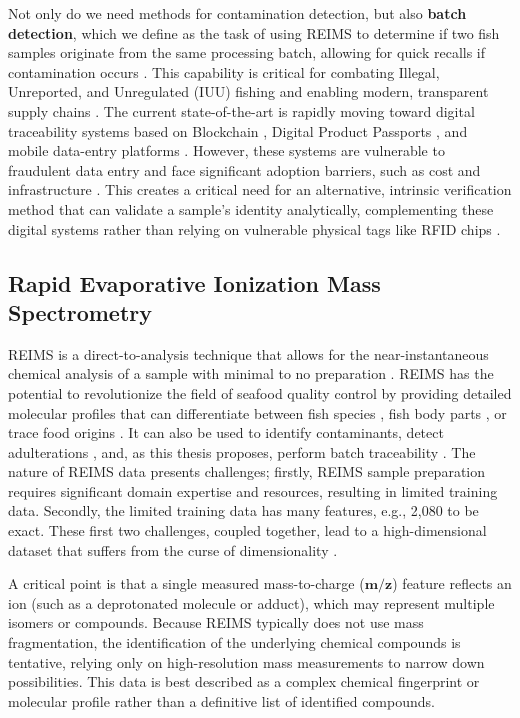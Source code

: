 Not only do we need methods for contamination detection, but also
\textbf{batch detection}, which we define as the task of using REIMS to determine if two fish samples originate from the same processing batch, allowing for quick recalls if contamination occurs \citep{Mai2010}. This capability is critical for combating Illegal, Unreported, and Unregulated (IUU) fishing \citep{Helyar2014} and enabling modern, transparent supply chains \citep{turkson2025digital}. The current state-of-the-art is rapidly moving toward digital traceability systems based on Blockchain \citep{dahariya2025enhancing}, Digital Product Passports \citep{jiang2025traceability}, and mobile data-entry platforms \citep{Untal2025, Gastaldi2025}. However, these systems are vulnerable to fraudulent data entry and face significant adoption barriers, such as cost and infrastructure \citep{Untal2025}. This creates a critical need for an alternative, intrinsic verification method that can validate a sample's identity analytically, complementing these digital systems rather than relying on vulnerable physical tags like RFID chips \citep{Mai2010}.

\subsection{Rapid Evaporative Ionization Mass Spectrometry}

REIMS \citep{Schaefer2009, Cafarella2024} is a direct-to-analysis technique that allows for the near-instantaneous chemical analysis of a sample with minimal to no preparation \citep{Henderson2025, Pruekprasert2025}. REIMS has the potential to revolutionize the field of seafood quality control \citep{Cafarella2024, Black2017} by providing detailed molecular profiles that can differentiate between fish species \citep{Black2017, Shen2020, Shen2022}, fish body parts \citep{Black2019}, or trace food origins \citep{Gao2025,Gkarane2025, Lu2024}. It can also be used to identify contaminants, detect adulterations \citep{Premanandh2013}, and, as this thesis proposes, perform batch traceability \citep{Mai2010}. The nature of REIMS data presents challenges; firstly, REIMS sample preparation requires significant domain expertise and resources, resulting in limited training data. Secondly, the limited training data has many features, e.g., 2,080 to be exact. These first two challenges, coupled together, lead to a high-dimensional dataset that suffers from the curse of dimensionality \citep{Koppen2000}.

A critical point is that a single measured mass-to-charge ($\mathbf{m/z}$) feature reflects an ion (such as a deprotonated molecule or adduct), which may represent multiple isomers or compounds. Because REIMS typically does not use mass fragmentation, the identification of the underlying chemical compounds is tentative, relying only on high-resolution mass measurements to narrow down possibilities. This data is best described as a complex chemical fingerprint or molecular profile rather than a definitive list of identified compounds.

